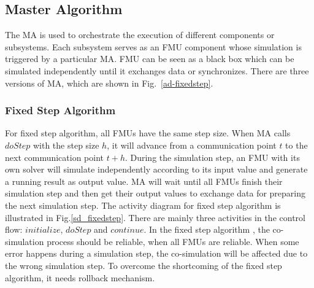 \subsection{Master Algorithm}
The MA is used to orchestrate the execution of different components or subsystems. Each subsystem serves as an FMU component whose simulation is triggered by a particular MA. FMU can be seen as a black box which can be simulated independently until it exchanges data or synchronizes. There are three versions of MA, which are shown in Fig.~\ref{ad-fixedstep}.
\begin{figure}[htbp]
\end{figure}
\subsubsection{Fixed Step Algorithm}
For fixed step algorithm, all FMUs have the same step size. When MA calls $doStep$ with the step size $h$, it will advance from a communication point $t$ to the next communication point $t+h$. During the simulation step, an FMU with its own solver will simulate independently according to its input value and generate a running result as output value. MA will wait until all FMUs finish their simulation step and then get their output values to exchange data for preparing the next simulation step. The activity diagram for fixed step algorithm is illustrated in Fig.\ref{sd_fixedstep}. There are mainly three activities in the control flow: $initialize$, $doStep$ and $continue$. In the fixed step algorithm \cite{BromanBGLMTW13}, the co-simulation process should be reliable, when all FMUs are reliable. When some error happens during a simulation step, the co-simulation will be affected due to the wrong simulation step. To overcome the shortcoming of the fixed step algorithm, it needs rollback mechanism.
